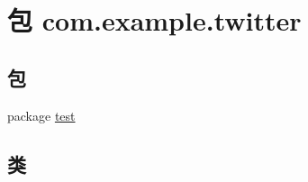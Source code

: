\hypertarget{namespacecom_1_1example_1_1twitter}{}\section{包 com.\+example.\+twitter}
\label{namespacecom_1_1example_1_1twitter}
\subsection*{包}
\begin{DoxyCompactItemize}
\item 
package \mbox{\hyperlink{namespacecom_1_1example_1_1twitter_1_1test}{test}}
\end{DoxyCompactItemize}
\subsection*{类}
